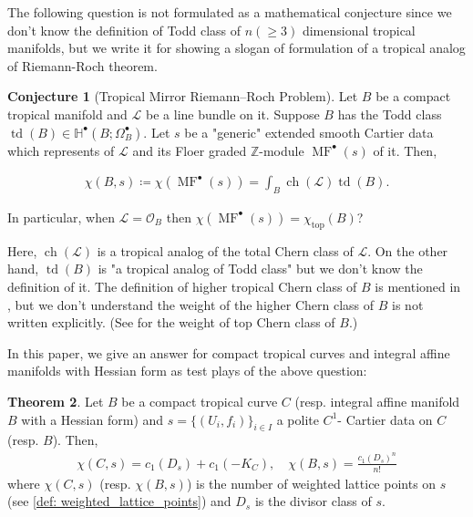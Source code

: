 \documentclass[a4paper,dvipdfmx,reqno,12pt]{amsart}
\theoremstyle{definition}
\newtheorem{Thm}{Theorem}[section]
\newtheorem{Conj}[Thm]{Conjecture}
\newcommand{\deq}{\coloneqq}
\newcommand{\Z}{\mathbb{Z}}%
\newcommand{\mb}[1]{\mathbb{#1}}%
\newcommand{\mcal}[1]{\mathcal{#1}}%
\newcommand{\opn}[1]{\operatorname{#1}}
\numberwithin{equation}{section}
\begin{document}
The following question is not formulated as a mathematical 
conjecture since we don't know the definition of Todd 
class of $n(\geq 3)$ dimensional tropical manifolds,
but we write it for showing a slogan of formulation 
of a tropical analog of Riemann-Roch theorem.

\begin{Conj}[{Tropical Mirror Riemann--Roch Problem}]
Let $B$ be a compact tropical manifold and $\mcal{L}$
be a line bundle on it. Suppose $B$ has the Todd class
$\opn{td}(B) \in \mb{H}^{\bullet}(B;\Omega_B^{\bullet})$.
 Let $s$ be a "generic"
extended smooth Cartier data which represents of $\mcal{L}$
and its Floer graded $\Z$-module $\opn{MF}^{\bullet}(s)$
of it. Then,

\begin{align}
\chi(B,s)  \deq \chi(\opn{MF}^{\bullet}(s))=\int_B \opn{ch}(\mcal{L})\opn{td}(B).
\end{align}

In particular, when $\mcal{L}=\mcal{O}_B$ then
$\chi(\opn{MF}^{\bullet}(s))=\chi_{\opn{top}}(B)$?
\end{Conj}

Here, $\opn{ch}(\mcal{L})$ is a tropical analog of 
the total Chern class of $\mcal{L}$.
On the other hand, $\opn{td}(B)$ is
"a tropical analog of Todd class"
but we don't know the definition of it. 
The definition of higher tropical Chern class of $B$
is mentioned in \cite[5.3]{mikhalkinTropicalGeometryIts2006},
but we don't understand the weight of the higher Chern class 
of $B$ is not written explicitly.
(See \cite[Definition 3.20]{shawTropicalSurfaces2015a} for 
the weight of top Chern class of $B$.)


In this paper, we give an answer for compact tropical curves 
and integral affine manifolds with Hessian form
as test plays of the above question:

\begin{Thm} \label{thm: main}
Let $B$ be a compact tropical curve $C$ (resp. integral 
affine manifold $B$
with a Hessian form) and $s=\{(U_i,f_i)\}_{i\in I}$ a polite $C^{1}$-
Cartier data on $C$ (resp. $B$). Then,
\begin{align}
\chi(C,s)=c_1(D_s)+c_1(-K_C), \quad \chi(B,s)=\frac{c_1(D_s)^{n}}{n!}
\end{align}
where $\chi(C,s)$ (resp. $\chi(B,s)$) is the number of weighted lattice
points on $s$ (see \cref{def: weighted_lattice_points}) and $D_s$ is the divisor class of $s$.
\end{Thm}
\end{document}
